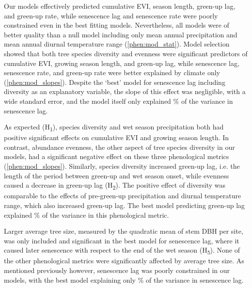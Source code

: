 \begin{refsection}
Our models effectively predicted cumulative EVI, season length, green-up lag, and green-up rate, while senescence lag and senescence rate were poorly constrained even in the best fitting models. Nevertheless, all models were of better quality than a null model including only mean annual precipitation and mean annual diurnal temperature range (\autoref{phen:mod_stat}). Model selection showed that both tree species diversity and evenness were significant predictors of cumulative EVI, growing season length, and green-up lag, while senescence lag, senescence rate, and green-up rate were better explained by climate only (\autoref{phen:mod_slopes}). Despite the `best' model for senescence lag including diversity as an explanatory variable, the slope of this effect was negligible, with a wide standard error, and the model itself only explained \senesLagrsq{}\% of the variance in senescence lag.

As expected (H\textsubscript{1}), species diversity and wet season precipitation both had positive significant effects on cumulative EVI and growing season length. In contrast, abundance evenness, the other aspect of tree species diversity in our models, had a significant negative effect on these three phenological metrics (\autoref{phen:mod_slopes}). Similarly, species diversity increased green-up lag, i.e. the length of the period between green-up and wet season onset, while evenness caused a decrease in green-up lag (H\textsubscript{2}). The positive effect of diversity was comparable to the effects of pre-green-up precipitation and diurnal temperature range, which also increased green-up lag. The best model predicting green-up lag explained \greenLagrsq{}\% of the variance in this phenological metric.

Larger average tree size, measured by the quadratic mean of stem DBH per site, was only included and significant in the best model for senescence lag, where it caused later senescence with respect to the end of the wet season (H\textsubscript{5}). None of the other phenological metrics were significantly affected by average tree size. As mentioned previously however, senescence lag was poorly constrained in our models, with the best model explaining only \senesLagrsq{}\% of the variance in senescence lag.


\end{refsection}
